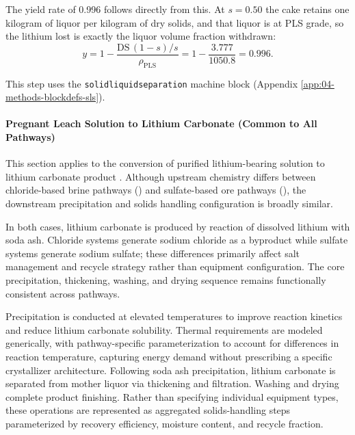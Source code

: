 \documentclass{article}
\renewcommand\_{\textunderscore\allowbreak}
\begin{document}
The yield rate of 0.996 follows directly from this. At $s = 0.50$ the cake retains one kilogram of liquor per kilogram of dry solids, and that liquor is at PLS grade, so the lithium lost is exactly the liquor volume fraction withdrawn:
\begin{equation}
	y = 1 - \frac{\mathrm{DS}\,(1-s)/s}{\rho_\text{PLS}}
	  = 1 - \frac{3.777}{1050.8} = 0.996.
\end{equation}

This step uses the \texttt{solid\_liquid\_separation} machine block (Appendix \ref{app:04-methods-blockdefs-sls}).

\paragraph{Pregnant Leach Solution to Lithium Carbonate (Common to All Pathways)}\label{app:04-methods-facilitychoices-pls}\leavevmode\par

This section applies to the conversion of purified lithium-bearing solution to lithium carbonate product \citep{srkconsultingSECTechnicalReport2023a, chordiaLifeCycleEnvironmental2022}. Although upstream chemistry differs between chloride-based brine pathways () and sulfate-based ore pathways (), the downstream precipitation and solids handling configuration is broadly similar.

In both cases, lithium carbonate is produced by reaction of dissolved lithium with soda ash. Chloride systems generate sodium chloride as a byproduct while sulfate systems generate sodium sulfate; these differences primarily affect salt management and recycle strategy rather than equipment configuration. The core precipitation, thickening, washing, and drying sequence remains functionally consistent across pathways.

Precipitation is conducted at elevated temperatures to improve reaction kinetics and reduce lithium carbonate solubility. Thermal requirements are modeled generically, with pathway-specific parameterization to account for differences in reaction temperature, capturing energy demand without prescribing a specific crystallizer architecture. Following soda ash precipitation, lithium carbonate is separated from mother liquor via thickening and filtration. Washing and drying complete product finishing. Rather than specifying individual equipment types, these operations are represented as aggregated solids-handling steps parameterized by recovery efficiency, moisture content, and recycle fraction.
\end{document}
